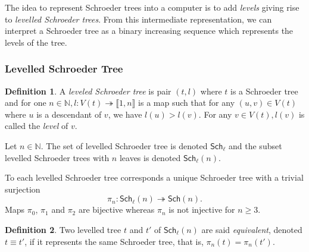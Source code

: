 \documentclass[a4paper,10pt]{amsart}
\newcommand\Sch{\mathsf{Sch}}
\newcommand\Schl{\mathsf{Sch}_\ell}
\newcommand\nn{n}
\newcommand\NN{\mathbb{N}}
\newcommand{\IEM}[2]{\llbracket #1,#2 \rrbracket}
\newcommand{\Schw}{Schroeder} %
\theoremstyle{definition}
\newtheorem{defi}{Definition}
\begin{document}
The idea to represent \Schw{} trees into a computer is to add \emph{levels} giving rise to \emph{levelled \Schw{} trees}. From this intermediate representation, we can interpret a \Schw{} tree as a binary increasing sequence which represents the levels of the tree.

\subsubsection{Levelled Schroeder Tree}

\begin{defi} \label{defi:levelled_trees}
	A \emph{leveled \Schw{} tree} is pair $(t,l)$ where $t$ is a \Schw{} tree and for one $n\in\NN,l:V(t)\twoheadrightarrow \IEM{1}{n}$ is a map such that for any $(u,v)\in V(t)$ where $u$ is a descendant of $v$, we have $l(u)>l(v)$. For any $v\in V(t), l(v)$ is called the \emph{level} of $v$. 
	
	Let $n\in\NN.$
	The set of levelled \Schw{} tree is denoted $\Schl$ and the subset levelled \Schw{} trees with $n$ leaves is denoted $\Schl(\nn)$.
\end{defi}
To each levelled \Schw{} tree corresponds a unique Schroeder tree with a trivial surjection
\begin{equation}
	\pi_\nn:\Schl(\nn)\twoheadrightarrow\Sch(\nn).
\end{equation}
Maps $\pi_0$, $\pi_1$ and $\pi_2$ are bijective whereas $\pi_\nn$ is not injective for $n\geq 3$.

\begin{defi}
	Two levelled tree $t$ and $t'$ of $\Schl(\nn)$ are said \emph{equivalent}, denoted $t\equiv t'$, if it represents the same Schroeder tree, that is, $\pi_\nn(t)=\pi_\nn(t')$.
\end{defi}
\end{document}
